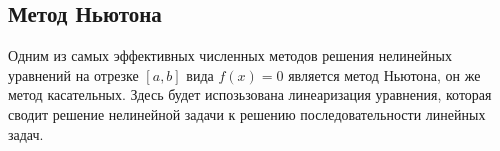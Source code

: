 \documentclass[../main.tex]{subfile}
\begin{document}
\subsection{Метод Ньютона}

Одним из самых эффективных численных методов решения нелинейных уравнений на
отрезке $[a,b]$ вида $f(x)=0$ является метод Ньютона, он же метод касательных.
Здесь будет испозьзована линеаризация уравнения, которая сводит решение
нелинейной задачи к решению последовательности линейных задач.
\end{document}
